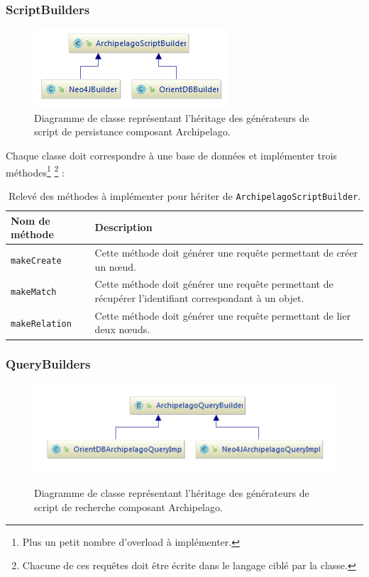 \documentclass[a4paper,fleqn,12pt,oneside]{report}
\begin{document}
\newpage
{}
\subsubsection{ScriptBuilders}


\begin{figure}[!ht]
\centering
\includegraphics[scale=1.5]{figures/scriptBuilders.png}
\caption{Diagramme de classe représentant l'héritage des générateurs de script de persistance composant Archipelago.}
\label{fig:ScriptQuery}
\end{figure}

Chaque classe doit correspondre à une base de données et implémenter trois méthodes\footnote{Plus un petit nombre d'overload à implémenter.} \footnote{Chacune de ces requêtes doit être écrite dans le langage ciblé par la classe.} :
\begin{table}[ht!]
\centering
\begin{tabular}[c]{|l|M{12cm}|}
\hline
\textbf{Nom de méthode} & \textbf{Description}  \tabularnewline
\hline
\texttt{makeCreate} &  Cette méthode doit générer une requête permettant de créer un nœud. \tabularnewline
\hline
\texttt{makeMatch} & Cette méthode doit générer une requête permettant de récupérer l'identifiant correspondant à un objet. \tabularnewline
\hline
\texttt{makeRelation} &  Cette méthode doit générer une requête permettant de lier deux nœuds.  \tabularnewline
\hline

\end{tabular}
\caption{Relevé des méthodes à implémenter pour hériter de \texttt{ArchipelagoScriptBuilder}.}
\label{tab:ArchipelagoScriptBuilder}
\end{table}
\newpage
{}
\subsubsection{QueryBuilders}

\begin{figure}[!ht]
\centering
\includegraphics[scale=1.5]{figures/queryBuilders.png}
\label{fig:QueryBuilders}
\caption{Diagramme de classe représentant l'héritage des générateurs de script de recherche composant Archipelago.}
\end{figure}
\end{document}
